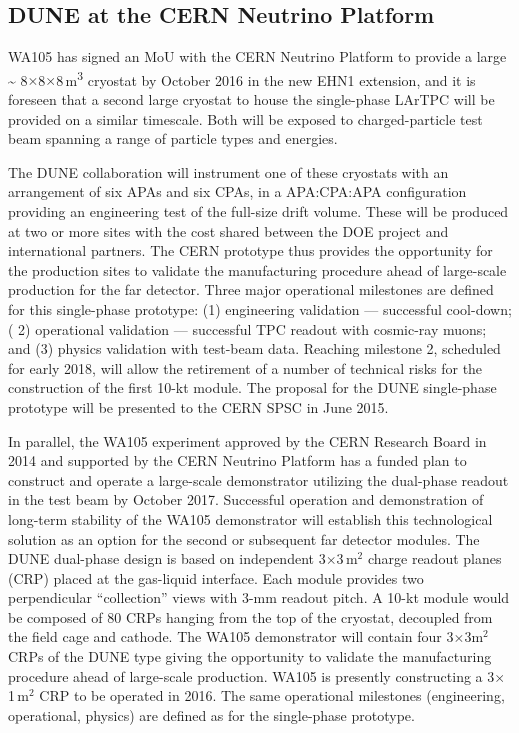 \subsection{DUNE at the CERN Neutrino Platform}

WA105 has signed an MoU with the CERN Neutrino Platform to provide a large \textasciitilde{} 
8$\times$8$\times$8\,m\textsuperscript{3} cryostat by October 2016 in the new EHN1 extension, 
and it is foreseen that a second large cryostat to house the single-phase LArTPC will 
be provided on a similar timescale. Both will be exposed to charged-particle test 
beam spanning a range of particle types and energies.   

The DUNE collaboration will instrument one of these cryostats with an arrangement 
of six APAs and six CPAs, in a APA:CPA:APA configuration providing an engineering 
test of the full-size drift volume. These will be produced at two or more sites with the cost 
shared between the DOE project and international partners. The CERN prototype thus 
provides the opportunity for the production sites to validate the manufacturing 
procedure ahead of large-scale production for the far detector. Three major operational 
milestones are defined for this single-phase prototype: (1) engineering validation 
--- successful cool-down;( 2) operational validation --- successful TPC readout with 
cosmic-ray muons; and (3) physics validation with test-beam data. Reaching milestone 
2, scheduled for early 2018, will allow the retirement of a number of technical 
risks for the construction of the first 10-kt module. The proposal for the DUNE 
single-phase prototype will be presented to the CERN SPSC in June 2015. 

In parallel, the WA105 experiment approved by the CERN Research Board in 2014 and supported 
by the CERN Neutrino Platform has a funded plan to construct and operate a large-scale 
demonstrator utilizing the dual-phase readout in the test beam by October 2017. 
Successful operation and demonstration of long-term stability of the WA105 demonstrator 
will establish this technological solution as an option for the second or subsequent 
far detector modules. The DUNE dual-phase design is based on independent 3$\times$3\,m$^2$
charge readout planes (CRP) placed at the gas-liquid interface. Each module provides 
two perpendicular ``collection'' views with 3-mm readout pitch. A 10-kt module 
would be composed of 80 CRPs hanging from the top of the cryostat, decoupled from 
the field cage and cathode. The WA105 demonstrator will contain four 3$\times$3m$^2$ 
CRPs of the DUNE type giving the opportunity to validate the manufacturing procedure 
ahead of large-scale production. WA105 is presently constructing a 3$\times$1\,m$^2$ 
CRP to be operated in 2016. The same operational milestones (engineering, operational, 
physics) are defined as for the single-phase prototype.

